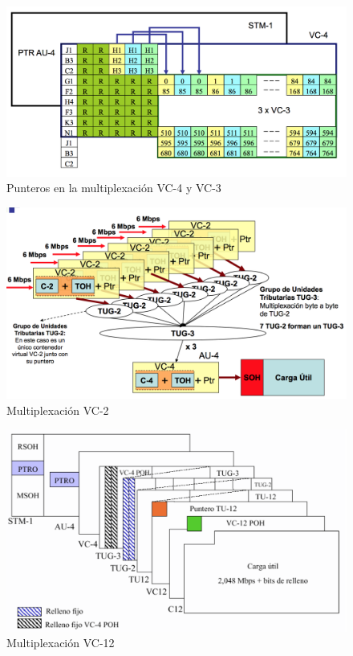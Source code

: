 \documentclass[10pt,portrait, twocolumn]{article}
\begin{document}
	\begin{figure}[!ht]
 		\centering
  		 \includegraphics[scale = 0.4]{images/PunterosMux}
		\caption{Punteros en la multiplexación VC-4 y VC-3}
	\end{figure}
	
	\begin{figure}[!ht]
 		\centering
  		 \includegraphics[scale = 0.4]{images/VC2Mux}
		\caption{Multiplexación VC-2}
	\end{figure}
	
	\begin{figure}[!ht]
 		\centering
  		 \includegraphics[scale = 0.4]{images/VC12Mux}
		\caption{Multiplexación VC-12}
	\end{figure}
	
\end{document}
